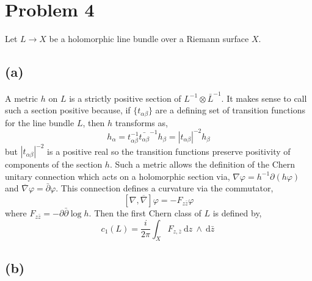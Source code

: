 \documentclass[12pt]{extarticle}
\renewcommand{\d}[1]{\: \mathrm{d}#1 \:}
\theoremstyle{definition}
\begin{document}
\section*{Problem 4}

Let $L \to X$ be a holomorphic line bundle over a Riemann surface $X$. 

\subsection*{(a)}

A metric $h$ on $L$ is a strictly positive section of $L^{-1} \otimes \bar{L}^{-1}$. It makes sense to call such a section positive because, if $\{ t_{\alpha \beta} \}$ are a defining set of transition functions for the line bundle $L$, then  $h$ transforms as,
\[ h_{\alpha} = t_{\alpha \beta}^{-1} \bar{t_{\alpha \beta}}^{-1} h_{\beta} = |t_{\alpha \beta}|^{-2} h_{\beta} \]
but $|t_{\alpha \beta}|^{-2}$ is a positive real so the transition functions preserve positivity of components of the section $h$. Such a metric allows the definition of the Chern unitary connection which acts on a holomorphic section via, $\nabla \varphi = h^{-1} \partial (h \varphi)$ and $\overline{\nabla} \varphi = \bar{\partial} \varphi$. This connection defines a curvature via the commutator,
\[ [\nabla, \overline{\nabla}] \varphi = - F_{z \bar{z}} \varphi \]
where $F_{z \bar{z}} = - \partial \bar{\partial} \log{h}$. Then the first Chern class of $L$ is defined by,
\[ c_1(L) = \frac{i}{2 \pi} \int_X F_{z, \bar{z}} \d{z} \wedge \d{\bar{z}} \]

\subsection*{(b)}
\end{document}
